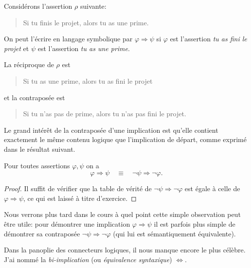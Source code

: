 \documentclass[french,course,oneside,theoremnosection]{lecture}
\newcommand{\iimplies}{\Rightarrow}
\newcommand{\ifff}{\Leftrightarrow}
\begin{document}
\begin{example}
Considérons l'assertion $\rho$ suivante:
\begin{quotation}
Si tu finis le projet, alors tu as une prime.
\end{quotation}
On peut l'écrire en langage symbolique par $\varphi \iimplies \psi$ si $\varphi$ est l'assertion \emph{tu as fini le projet} et $\psi$ est l'assertion \emph{tu as une prime}.

La réciproque de $\rho$ est
\begin{quotation}
Si tu as une prime, alors tu as fini le projet
\end{quotation}
et la contraposée est
\begin{quotation}
Si tu n'as pas de prime, alors tu n'as pas fini le projet.
\end{quotation}

\end{example}


Le grand intérêt de la contraposée d'une implication est qu'elle contient exactement le même contenu logique que l'implication de départ, comme exprimé dans le résultat suivant.
\begin{proposition}
Pour toutes assertions $\varphi, \psi$ on a 
\[
\varphi \iimplies \psi \quad \equiv \quad \neg \psi \iimplies \neg \varphi.
\]
\end{proposition}
\begin{proof}
Il suffit de vérifier que la table de vérité de $\neg  \psi \iimplies \neg \varphi$ est égale à celle de $\varphi \iimplies \psi$, ce qui est laissé à titre d'exercice.
\end{proof}

Nous verrons plus tard dans le cours à quel point cette simple observation peut être utile: pour démontrer une implication $\varphi \iimplies \psi$ il est parfois plus simple de démontrer sa contraposée $\neg \psi \iimplies \neg \varphi$ (qui lui est sémantiquement équivalente).

Dans la panoplie des connecteurs logiques, il nous manque encore le plus célèbre. J'ai nommé la \emph{bi-implication} (ou \emph{équivalence syntaxique}) $\ifff$.
\end{document}
